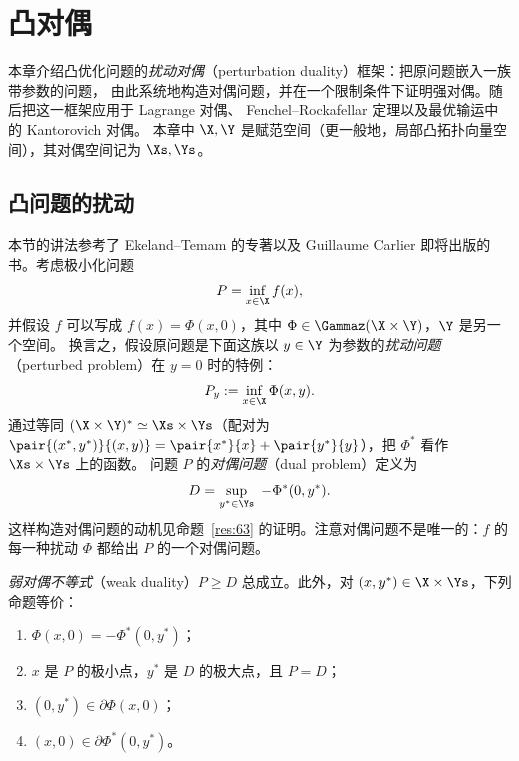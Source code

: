 \chapter{凸对偶}
\label{ch:ch05}

本章介绍凸优化问题的\emph{扰动对偶}（perturbation duality）框架：把原问题嵌入一族带参数的问题，
由此系统地构造对偶问题，并在一个限制条件下证明强对偶。随后把这一框架应用于 Lagrange 对偶、
Fenchel--Rockafellar 定理以及最优输运中的 Kantorovich 对偶。
本章中 $\X,\Y$ 是赋范空间（更一般地，局部凸拓扑向量空间），其对偶空间记为 $\Xs,\Ys$。

\section{凸问题的扰动}

本节的讲法参考了 Ekeland--Temam 的专著以及 Guillaume Carlier 即将出版的书。考虑极小化问题
\[
  P=\inf_{x\in\X}f(x),
\]
并假设 $f$ 可以写成 $f(x)=\Phi(x,0)$，其中 $\Phi\in\Gammaz(\X\times\Y)$，$\Y$ 是另一个空间。
换言之，假设原问题是下面这族以 $y\in\Y$ 为参数的\emph{扰动问题}（perturbed problem）在 $y=0$ 时的特例：
\[
  P_y:=\inf_{x\in\X}\Phi(x,y).
\]
通过等同 $(\X\times\Y)^*\simeq\Xs\times\Ys$（配对为 $\pair{(x^*,y^*)}{(x,y)}=\pair{x^*}{x}+\pair{y^*}{y}$），把 $\Phi^*$ 看作 $\Xs\times\Ys$ 上的函数。
问题 $P$ 的\emph{对偶问题}（dual problem）定义为
\[
  D=\sup_{y^*\in\Ys}\ -\Phi^*(0,y^*).
\]
这样构造对偶问题的动机见命题~\ref{res:63} 的证明。注意对偶问题不是唯一的：$f$ 的每一种扰动 $\Phi$ 都给出 $P$ 的一个对偶问题。

\begin{proposition}[弱对偶]
\label{res:63}
\emph{弱对偶不等式}（weak duality）$P\geqslant D$ 总成立。此外，对 $(x,y^*)\in\X\times\Ys$，下列命题等价：
\begin{enumerate}[label=(\roman*)]
  \item $\Phi(x,0)=-\Phi^*(0,y^*)$；
  \item $x$ 是 $P$ 的极小点，$y^*$ 是 $D$ 的极大点，且 $P=D$；
  \item $(0,y^*)\in\partial\Phi(x,0)$；
  \item $(x,0)\in\partial\Phi^*(0,y^*)$。
\end{enumerate}
\end{proposition}

